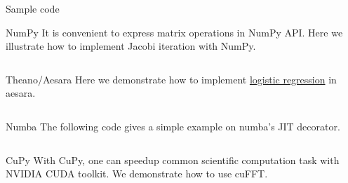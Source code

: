 \begin{newSec}{Sample code}
	\begin{newSubsec}{NumPy}
		It is convenient to express matrix operations in NumPy API.
		Here we illustrate how to implement Jacobi iteration with NumPy.
		\inputminted{python}{src/numpy.py}
	\end{newSubsec}
	\begin{newSubsec}{Theano/Aesara}
		Here we demonstrate how to implement \href{https://aesara.readthedocs.io/en/latest/tutorial/examples.html#a-real-example-logistic-regression}{logistic regression} in aesara.
		\inputminted{python}{src/theano.py}
	\end{newSubsec}
	\begin{newSubsec}{Numba}
		The following code gives a simple example on numba's JIT decorator.
		\inputminted{python}{src/numba.py}
	\end{newSubsec}
	\begin{newSubsec}{CuPy}
		With CuPy, one can speedup common scientific computation task with NVIDIA CUDA toolkit.
		We demonstrate how to use cuFFT.
		\inputminted{python}{src/cupy.py}
	\end{newSubsec}
\end{newSec}
